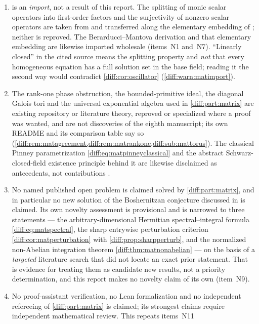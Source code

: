 \documentclass[11pt,letterpaper]{article}
\numberwithin{equation}{section}
\theoremstyle{definition}
\theoremstyle{remark}
\begin{document}
\begin{enumerate}[label=\textup{N\arabic*.},leftmargin=3.0em,itemsep=0.35em,start=53]
\item {} is an \emph{import}, not a result of this
report. The splitting of monic scalar operators into first-order factors and
the surjectivity of nonzero scalar operators are taken from
\cite[Lemma 2.4.19]{ADHNorm} and transferred along the elementary embedding of
\cite{ADH}; neither is reproved. The Berarducci--Mantova derivation and that
elementary embedding are likewise imported wholesale
(items~N1 and~N7). ``Linearly closed'' in the cited source means the splitting
property and \emph{not} that every homogeneous equation has a full solution set
in the base field; reading it the second way would contradict
\cref{diff:cor:oscillator} (\cref{diff:warn:matimport}).
\item The rank-one phase obstruction, the bounded-primitive ideal, the
diagonal Galois tori and the universal exponential algebra used in
\cref{diff:part:matrix} are existing repository or literature theory, reproved
or specialized where a proof was wanted, and are not discoveries of the eighth
manuscript; its own README and its comparison table say so
(\cref{diff:rem:matagreement,diff:rem:matrankone,diff:sub:mattorus}). The
classical Pinney parametrization \cref{diff:eq:matpinneyclassical} and the
abstract Schwarz-closed-field existence principle behind it are likewise
disclaimed as antecedents, not contributions
\cite{Pinney,ADHNorm,ADHSecond}.
\item No named published open problem is claimed solved by
\cref{diff:part:matrix}, and in particular no new solution of the Boshernitzan
conjecture discussed in \cite{ADHSecond} is claimed. Its own novelty
assessment is provisional and is narrowed to three statements --- the
arbitrary-dimensional Hermitian spectral--integral formula
\cref{diff:eq:matspectral}, the sharp entrywise perturbation criterion
\cref{diff:cor:matperturbation} with \cref{diff:prop:sharpperturb}, and the
normalized non-Abelian integration theorem
\cref{diff:thm:matnonabelian} --- on the basis of a \emph{targeted} literature
search that did not locate an exact prior statement. That is evidence for
treating them as candidate new results, not a priority determination, and this
report makes no novelty claim of its own (item~N9).
\item No proof-assistant verification, no Lean formalization and no
independent refereeing of \cref{diff:part:matrix} is claimed; its strongest
claims require independent mathematical review. This repeats items~N11

\end{enumerate}
\end{document}
